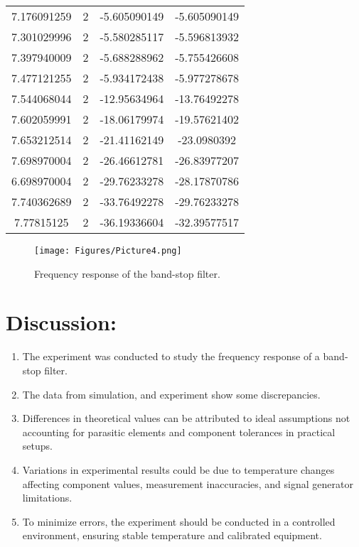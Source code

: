 \documentclass[a4paper, 12pt]{extarticle}
\begin{document}
\begin{longtable}{cccc}
    7.176091259 & 2     & -5.605090149 & -5.605090149 \\
    7.301029996 & 2     & -5.580285117 & -5.596813932 \\
    7.397940009 & 2     & -5.688288962 & -5.755426608 \\
    7.477121255 & 2     & -5.934172438 & -5.977278678 \\
    7.544068044 & 2     & -12.95634964 & -13.76492278 \\
    7.602059991 & 2     & -18.06179974 & -19.57621402 \\
    7.653212514 & 2     & -21.41162149 & -23.0980392 \\
    7.698970004 & 2     & -26.46612781 & -26.83977207 \\
    6.698970004 & 2     & -29.76233278 & -28.17870786 \\
    7.740362689 & 2     & -33.76492278 & -29.76233278 \\
    7.77815125 & 2     & -36.19336604 & -32.39577517 \\
\end{longtable}



\begin{figure}[htbp]
    \centering
    \texttt{[image: Figures/Picture4.png]}
    \caption{Frequency response of the band-stop filter.}
    \label{fig:Band_Stop_Filter_Response}
\end{figure}

\newpage
\restoregeometry
{}
\section{Discussion:}
\begin{enumerate}
    \item The experiment was conducted to study the frequency response of a band-stop filter.
    \item The data from simulation, and experiment show some discrepancies.
    \item Differences in theoretical values can be attributed to ideal assumptions not accounting for parasitic elements and component tolerances in practical setups.
    \item Variations in experimental results could be due to temperature changes affecting component values, measurement inaccuracies, and signal generator limitations.
    \item To minimize errors, the experiment should be conducted in a controlled environment, ensuring stable temperature and calibrated equipment.
\end{enumerate}
\end{document}
